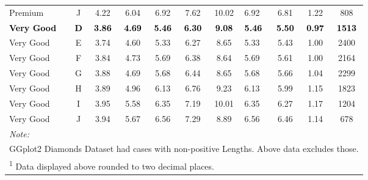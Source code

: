 \documentclass[
]{article}
\begin{document}
\begin{table}
{\begin{tabular}[t]{lcccccclccc}
Premium & J & 4.22 & 6.04 & 6.92 & 7.62 & 10.02 & 6.92 & 6.81 & 1.22 & 808\\
\textcolor{black}{\textbf{Very Good}} & \textcolor{black}{\textbf{D}} & \textcolor{black}{\textbf{3.86}} & \textcolor{black}{\textbf{4.69}} & \textcolor{black}{\textbf{5.46}} & \textcolor{black}{\textbf{6.30}} & \textcolor{black}{\textbf{9.08}} & \textcolor{black}{\textbf{5.46}} & \textcolor{black}{\textbf{5.50}} & \textcolor{black}{\textbf{0.97}} & \textcolor{black}{\textbf{1513}}\\
Very Good & E & 3.74 & 4.60 & 5.33 & 6.27 & 8.65 & 5.33 & 5.43 & 1.00 & 2400\\
\addlinespace
Very Good & F & 3.84 & 4.73 & 5.69 & 6.38 & 8.64 & 5.69 & 5.61 & 1.00 & 2164\\
Very Good & G & 3.88 & 4.69 & 5.68 & 6.44 & 8.65 & 5.68 & 5.66 & 1.04 & 2299\\
Very Good & H & 3.89 & 4.96 & 6.13 & 6.76 & 9.23 & 6.13 & 5.99 & 1.15 & 1823\\
Very Good & I & 3.95 & 5.58 & 6.35 & 7.19 & 10.01 & 6.35 & 6.27 & 1.17 & 1204\\
Very Good & J & 3.94 & 5.67 & 6.56 & 7.29 & 8.89 & 6.56 & 6.46 & 1.14 & 678\\
\bottomrule
\multicolumn{11}{l}{\rule{0pt}{1em}\textit{Note: }}\\
\multicolumn{11}{l}{\rule{0pt}{1em}GGplot2 Diamonds Dataset had cases with non-positive Lengths. Above data excludes those.}\\
\multicolumn{11}{l}{\rule{0pt}{1em}\textsuperscript{1} Data displayed above rounded to two decimal places.}\\
\end{tabular}}
\end{table}
\end{document}
